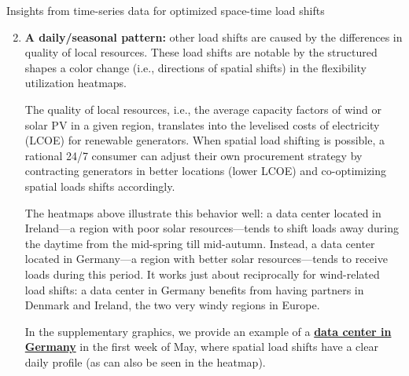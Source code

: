 \begin{frame}{Insights from time-series data for optimized space-time load shifts}

  {\footnotesize 

  \begin{enumerate}
    \setcounter{enumi}{1}

    \item {\bf A daily/seasonal pattern:} other load shifts are caused by the \alert{differences in quality of local resources}. These load shifts are notable by the structured shapes a color change (i.e., directions of spatial shifts) in the flexibility utilization heatmaps.

    \vspace{0.1cm}
    The quality of local resources, i.e., the average capacity factors of wind or solar PV in a given region, translates into the levelised costs of electricity (LCOE) for renewable generators. When spatial load shifting is possible, a rational 24/7 consumer can adjust their own procurement strategy by contracting generators in better locations (lower LCOE) and co-optimizing spatial loads shifts accordingly. 

    \vspace{0.1cm}
    The heatmaps above illustrate this behavior well: a data center located in Ireland---a region with poor solar resources---tends to shift loads away during the daytime from the mid-spring till mid-autumn. Instead, a data center located in Germany---a region with better solar resources---tends to receive loads during this period. It works just about reciprocally for wind-related load shifts: a data center in Germany benefits from having partners in Denmark and Ireland, the two very windy regions in Europe.

    \vspace{0.1cm}
    In the supplementary graphics, we provide an example of a {\bf \hyperlink{nb3}{data center in Germany}} in the first week of May, where spatial load shifts have a clear daily profile (as can also be seen in the heatmap).

  \end{enumerate}

  }
\end{frame}


